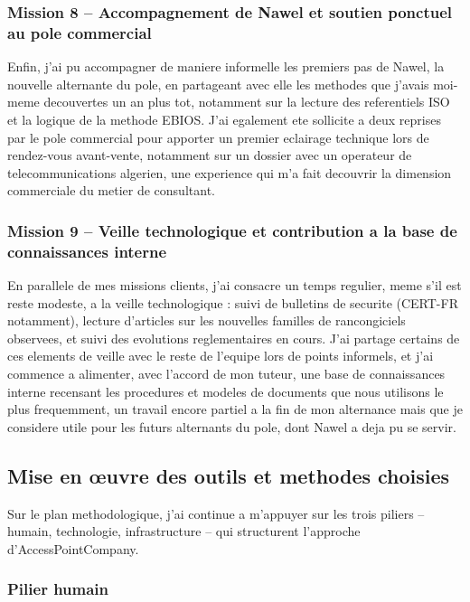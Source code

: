 \documentclass[11pt,a4paper]{article}
\begin{document}
\subsubsection*{Mission 8 -- Accompagnement de Nawel et soutien ponctuel au pole commercial}

Enfin, j'ai pu accompagner de maniere informelle les premiers pas de Nawel, la nouvelle alternante du pole, en partageant avec elle les methodes que j'avais moi-meme decouvertes un an plus tot, notamment sur la lecture des referentiels ISO et la logique de la methode EBIOS. J'ai egalement ete sollicite a deux reprises par le pole commercial pour apporter un premier eclairage technique lors de rendez-vous avant-vente, notamment sur un dossier avec un operateur de telecommunications algerien, une experience qui m'a fait decouvrir la dimension commerciale du metier de consultant.

\subsubsection*{Mission 9 -- Veille technologique et contribution a la base de connaissances interne}

En parallele de mes missions clients, j'ai consacre un temps regulier, meme s'il est reste modeste, a la veille technologique : suivi de bulletins de securite (CERT-FR notamment), lecture d'articles sur les nouvelles familles de rancongiciels observees, et suivi des evolutions reglementaires en cours. J'ai partage certains de ces elements de veille avec le reste de l'equipe lors de points informels, et j'ai commence a alimenter, avec l'accord de mon tuteur, une base de connaissances interne recensant les procedures et modeles de documents que nous utilisons le plus frequemment, un travail encore partiel a la fin de mon alternance mais que je considere utile pour les futurs alternants du pole, dont Nawel a deja pu se servir.

\subsection{Mise en \oe uvre des outils et methodes choisies}

Sur le plan methodologique, j'ai continue a m'appuyer sur les trois piliers -- humain, technologie, infrastructure -- qui structurent l'approche d'AccessPointCompany.

\subsubsection*{Pilier humain}
\end{document}
